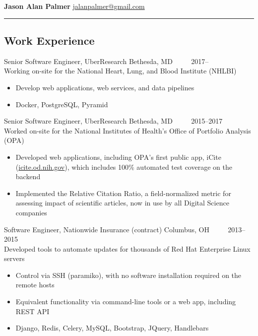 \documentclass[12pt]{report}
\begin{document}
\textbf{\large Jason Alan Palmer} \hfill \href{mailto:jalanpalmer@gmail.com}{jalanpalmer@gmail.com}

\rule{\textwidth}{1pt}

\subsection*{Work Experience}

Senior Software Engineer, UberResearch \hfill Bethesda, MD ~~~~ 2017--~~~~~~ \\
Working on-site for the National Heart, Lung, and Blood Institute (NHLBI)
\begin{itemize}
\item Develop web applications, web services, and data pipelines
\item Docker, PostgreSQL, Pyramid
\\
\end{itemize}

Senior Software Engineer, UberResearch \hfill Bethesda, MD ~~~~ 2015--2017 \\
Worked on-site for the National Institutes of Health's Office of Portfolio Analysis (OPA)
\begin{itemize}
\item Developed web applications, including OPA's first public app, iCite (\href{https://icite.od.nih.gov}{icite.od.nih.gov}), which includes 100\% automated test coverage on the backend
\item Implemented the Relative Citation Ratio, a field-normalized metric for assessing impact of scientific articles, now in use by all Digital Science companies
\\
\end{itemize}

Software Engineer, Nationwide Insurance (contract) \hfill Columbus, OH ~~~~ 2013--2015 \\
Developed tools to automate updates for thousands of Red Hat Enterprise Linux servers
\begin{itemize}
\item Control via SSH (paramiko), with no software installation required on the remote hosts
\item Equivalent functionality via command-line tools or a web app, including REST API
\item Django, Redis, Celery, MySQL, Bootstrap, JQuery, Handlebars
\\
\end{itemize}
\end{document}
